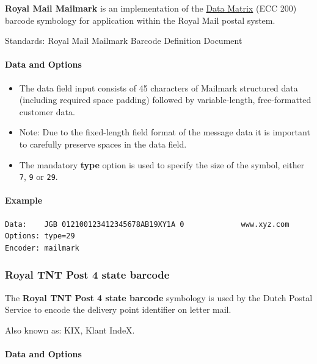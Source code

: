 \textbf{Royal Mail Mailmark} is an implementation of the
\protect\hyperlink{data-matrix}{Data Matrix} (ECC 200) barcode symbology
for application within the Royal Mail postal system.

Standards: Royal Mail Mailmark Barcode Definition Document

\hypertarget{data-and-options-48}{%
\paragraph{Data and Options}\label{data-and-options-48}}

\begin{itemize}
\tightlist
\item
  The data field input consists of 45 characters of Mailmark structured
  data (including required space padding) followed by variable-length,
  free-formatted customer data.
\item
  Note: Due to the fixed-length field format of the message data it is
  important to carefully preserve spaces in the data field.
\item
  The mandatory \textbf{type} option is used to specify the size of the
  symbol, either \texttt{7}, \texttt{9} or \texttt{29}.
\end{itemize}

\hypertarget{example-11}{%
\paragraph{Example}\label{example-11}}

\begin{verbatim}
Data:    JGB 012100123412345678AB19XY1A 0             www.xyz.com
Options: type=29
Encoder: mailmark
\end{verbatim}

\hypertarget{royal-tnt-post-4-state-barcode}{%
\subsubsection{Royal TNT Post 4 state
barcode}\label{royal-tnt-post-4-state-barcode}}

The \textbf{Royal TNT Post 4 state barcode} symbology is used by the
Dutch Postal Service to encode the delivery point identifier on letter
mail.

Also known as: KIX, Klant IndeX.

\hypertarget{data-and-options-49}{%
\paragraph{Data and Options}\label{data-and-options-49}}

